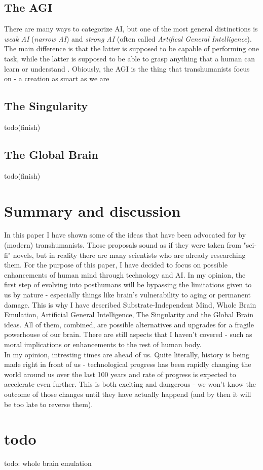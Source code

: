 \documentclass[12pt]{article}
\begin{document}
\subsection{The AGI}
	There are many ways to categorize AI, but one of the most general distinctions is \emph{weak AI} (\emph{narrow AI}) and \emph{strong AI} (often called \emph{Artifical General Intelligence}). The main difference is that the latter is supposed to be capable of performing one task, while the latter is supposed to be able to grasp anything that a human can learn or understand \cite{wikipediaAgi}. Obiously, the AGI is the thing that transhumanists focus on - a creation as smart as we are 
\subsection{The Singularity}
todo(finish)
\subsection{The Global Brain}
	todo(finish)
	
\section{Summary and discussion} 
	In this paper I have shown some of the ideas that have been advocated for by (modern) transhumanists. Those proposals sound as if they were taken from "sci-fi" novels, but in reality there are many scientists who are already researching them. For the purpose of this paper, I have decided to focus on possible enhancements of human mind through technology and AI. In my opinion, the first step of evolving into posthumans will be bypassing the limitations given to us by nature - especially things like brain's vulnerability to aging or permanent damage. This is why I have described Substrate-Independent Mind, Whole Brain Emulation, Artificial General Intelligence, The Singularity and the Global Brain ideas. All of them, combined, are possible alternatives and upgrades for a fragile powerhouse of our brain. There are still aspects that I haven't covered - such as moral implications or enhancements to the rest of human body. 
	\\In my opinion, intresting times are ahead of us. Quite literally, history is being made right in front of us - technological progress has been rapidly changing the world around us over the last 100 years and rate of progress is expected to accelerate even further. This is both exciting and dangerous - we won't know the outcome of those changes until they have actually happend (and by then it will be too late to reverse them). 
\section{todo}
todo: whole brain emulation
\raggedright


\end{document}
